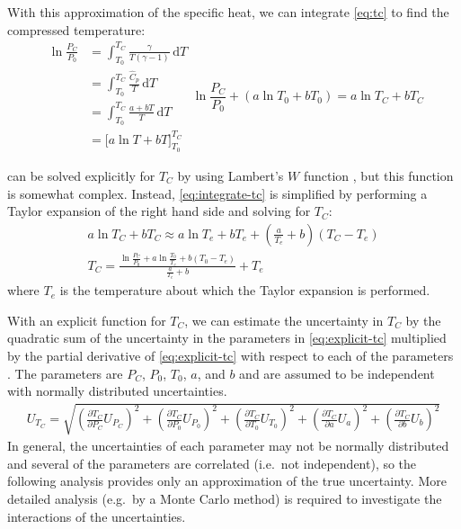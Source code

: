 \documentclass[../main.tex]{subfiles}
\begin{document}
With this approximation of the specific heat, we can integrate \cref{eq:tc}
to find the compressed temperature:
%
\begin{subequations}
\begin{align}
\ln{\frac{P_C}{P_0}}
&= \int_{T_0}^{T_{C}} \! \frac{\gamma}{T\left(\gamma-1\right)} \, \mathrm{d} T \\
&= \int_{T_0}^{T_{C}} \! \frac{\hat{C}_p}{T} \, \mathrm{d} T \\
&= \int_{T_0}^{T_{C}} \! \frac{a + b T}{T} \, \mathrm{d} T\\
&= \Big[a \ln{T} + b T \Big]_{T_0}^{T_C}
\end{align}
\begin{equation}
\ln{\frac{P_C}{P_0}} + \left(a \ln{T_0} + b T_0\right) = a \ln{T_C} + b T_C \label{eq:integrate-tc}
\end{equation}
\end{subequations}

 can be solved explicitly for $T_C$ by using
Lambert's $W$ function \cite{Corless1996}, but this function is somewhat
complex. Instead, \cref{eq:integrate-tc} is simplified by performing a
Taylor expansion of the right hand side and solving for $T_C$:
%
\begin{gather}
a \ln{T_C} + b T_C \approx a \ln{T_e} + bT_e + \left(\frac{a}{T_e} + b\right)\left(T_C - T_e\right) \\
T_C = \frac{\ln{\frac{P_C}{P_0}} + a \ln{\frac{T_0}{T_e}} + b\left(T_0 - T_e\right)}{\frac{a}{T_e}+b} + T_e \label{eq:explicit-tc}
\end{gather}
%
where $T_e$ is the temperature about which the Taylor expansion is performed.

With an explicit function for $T_C$, we can estimate the uncertainty in
$T_C$ by the quadratic sum of the uncertainty in the parameters in
\cref{eq:explicit-tc} multiplied by the partial derivative of
\cref{eq:explicit-tc} with respect to each of the parameters
\cite{Taylor1982}. The parameters are $P_C$, $P_0$, $T_0$, $a$, and $b$
and are assumed to be independent with normally distributed uncertainties.
%
\begin{align}
\label{eq:tc-unc}
U_{T_C} = \sqrt{\left(\frac{\partial T_C}{\partial P_C} U_{P_C}\right)^2 + \left(\frac{\partial T_C}{\partial P_0} U_{P_0}\right)^2 +
                \left(\frac{\partial T_C}{\partial T_0} U_{T_0}\right)^2 + \left(\frac{\partial T_C}{\partial a} U_{a}\right)^2 +
                \left(\frac{\partial T_C}{\partial b} U_{b}\right)^2}
\end{align}
%
In general, the uncertainties of each parameter may not be normally
distributed and several of the parameters are correlated (i.e.\ not
independent), so the following analysis provides only an approximation
of the true uncertainty. More detailed analysis (e.g.\ by a Monte Carlo
method) is required to investigate the interactions of the uncertainties.
\end{document}
